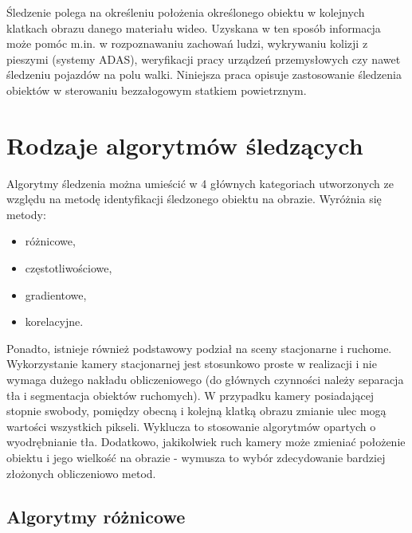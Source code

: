 Śledzenie polega na określeniu położenia określonego obiektu w kolejnych klatkach obrazu danego materiału wideo. %
Uzyskana w ten sposób informacja może pomóc m.in. w rozpoznawaniu zachowań ludzi, wykrywaniu kolizji z pieszymi (systemy ADAS), weryfikacji pracy urządzeń przemysłowych czy nawet śledzeniu pojazdów na polu walki. Niniejsza praca opisuje zastosowanie śledzenia obiektów w sterowaniu bezzałogowym statkiem powietrznym.


\section{Rodzaje algorytmów śledzących}
\label{sec:algorytmySledzace}

Algorytmy śledzenia można umieścić w 4 głównych kategoriach utworzonych ze względu na metodę identyfikacji śledzonego obiektu na obrazie. 
Wyróżnia się metody:
\begin{itemize}
	\item różnicowe,
	\item częstotliwościowe,
	\item gradientowe,
	\item korelacyjne.
\end{itemize}

Ponadto, istnieje również podstawowy podział na sceny stacjonarne i ruchome. 
Wykorzystanie kamery stacjonarnej jest stosunkowo proste w realizacji i nie wymaga dużego nakładu obliczeniowego (do głównych czynności należy separacja tła i segmentacja obiektów ruchomych). %
W przypadku kamery posiadającej stopnie swobody, pomiędzy obecną i kolejną klatką obrazu zmianie ulec mogą wartości wszystkich pikseli. %
Wyklucza to stosowanie algorytmów opartych o wyodrębnianie tła. 
Dodatkowo, jakikolwiek ruch kamery może zmieniać położenie obiektu i jego wielkość na obrazie - wymusza to wybór zdecydowanie bardziej złożonych obliczeniowo metod. %

\subsection{Algorytmy różnicowe}

